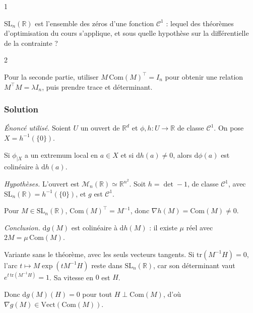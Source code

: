 \documentclass[11pt,a4paper]{article}
\newcommand{\equationajustee}[1]{%
  \sbox{\boiteequation}{$\displaystyle #1$}%
  \ifdim\wd\boiteequation>\linewidth
    \[\resizebox{\linewidth}{!}{\usebox{\boiteequation}}\]%
  \else
    \[#1\]%
  \fi}
\begin{document}
\begin{indication}{1}

\({\mathrm{SL}}_n(\mathbb R)\) est l'ensemble des zéros d'une fonction \(\mathcal C^1\) : lequel des théorèmes d'optimisation du cours s'applique, et sous quelle hypothèse sur la différentielle de la contrainte ?

\end{indication}

\begin{indication}{2}

Pour la seconde partie, utiliser \(M\,\mathrm{Com}(M)^\top=I_n\) pour obtenir une relation \(M^\top M=\lambda I_n\), puis prendre trace et déterminant.

\end{indication}

\hypertarget{solution-15}{%
\subsubsection{Solution}\label{solution-15}}

\emph{Énoncé utilisé.} Soient \(U\) un ouvert de \(\mathbb R^d\) et \(\phi,h:U\to\mathbb R\) de classe \(\mathcal C^1\). On pose \(X=h^{-1}(\{0\})\).

Si \(\phi_{|X}\) a un extremum local en \(a\in X\) et si \(\mathrm dh(a)\ne0\), alors \(\mathrm d\phi(a)\) est colinéaire à \(\mathrm dh(a)\).

\emph{Hypothèses.} L'ouvert est \(\mathcal M_n(\mathbb R)\simeq\mathbb R^{n^2}\). Soit \(h=\det-1\), de classe \(\mathcal C^1\), avec \({\mathrm{SL}}_n(\mathbb R)=h^{-1}(\{0\})\), et \(g\) est \(\mathcal C^1\).

Pour \(M\in{\mathrm{SL}}_n(\mathbb R)\), \(\mathrm{Com}(M)^\top=M^{-1}\), donc \(\nabla h(M)=\mathrm{Com}(M)\ne0\).

\emph{Conclusion.} \(\mathrm dg(M)\) est colinéaire à \(\mathrm dh(M)\) : il existe \(\mu\) réel avec \(2M=\mu\,\mathrm{Com}(M)\).

\equationajustee{\boxed{M=\lambda\,\mathrm{Com}(M),\ \text{avec}\ \lambda=\mu/2\in\mathbb R.}}

Variante sans le théorème, avec les seuls vecteurs tangents. Si \(\mathrm{tr}(M^{-1}H)=0\), l'arc \(t\mapsto M\exp(tM^{-1}H)\) reste dans \({\mathrm{SL}}_n(\mathbb R)\), car son déterminant vaut \(e^{t\,\mathrm{tr}(M^{-1}H)}=1\). Sa vitesse en \(0\) est \(H\).

Donc \(\mathrm dg(M)(H)=0\) pour tout \(H\perp\mathrm{Com}(M)\), d'où \(\nabla g(M)\in\mathrm{Vect}(\mathrm{Com}(M))\).
\end{document}
